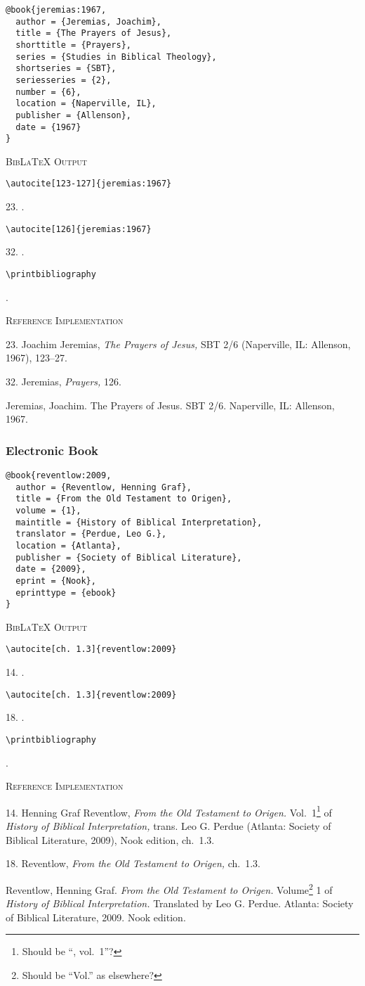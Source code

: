 \documentclass[a4paper]{article}
\newcommand\citetest[5]{%
  {\textsc{BibLaTeX Output}\par
   \nobreak
   \texttt{\textbackslash autocite[#2]\{#5\}}\par
   \color{biblatex-colour}
   #1. \cite[#2]{#5}.\par
   \color{black}
   \texttt{\textbackslash autocite[#4]\{#5\}}\par
   \color{biblatex-colour}
   #3. \cite[#4]{#5}.\par
   \color{black}
   \texttt{\textbackslash printbibliography}\par
   \color{biblatex-colour}
   \hangindent\bibindent\bibentrycite{#5}.\par}}
\newenvironment{refimp}{%
  \begin{minipage}{\linewidth}
    \setlength{\parskip}{1ex}
    \textsc{Reference Implementation}\par
    \nobreak
    \color{reference-colour}
}{\end{minipage}}
\begin{document}
\begin{lstlisting}
@book{jeremias:1967,
  author = {Jeremias, Joachim},
  title = {The Prayers of Jesus},
  shorttitle = {Prayers},
  series = {Studies in Biblical Theology},
  shortseries = {SBT},
  seriesseries = {2},
  number = {6},
  location = {Naperville, IL},
  publisher = {Allenson},
  date = {1967}
}
\end{lstlisting}

\citetest{23}{123-127}{32}{126}{jeremias:1967}

\begin{refimp}
  23. Joachim Jeremias, \emph{The Prayers of Jesus,} SBT 2/6 (Naperville, IL:
  Allenson, 1967), 123–27.

  32. Jeremias, \emph{Prayers,} 126.

  \hangindent\bibindent Jeremias, Joachim. The Prayers of Jesus. SBT 2/6.
  Naperville, IL: Allenson, 1967.
\end{refimp}

\subsubsection{Electronic Book}

\begin{lstlisting}
@book{reventlow:2009,
  author = {Reventlow, Henning Graf},
  title = {From the Old Testament to Origen},
  volume = {1},
  maintitle = {History of Biblical Interpretation},
  translator = {Perdue, Leo G.},
  location = {Atlanta},
  publisher = {Society of Biblical Literature},
  date = {2009},
  eprint = {Nook},
  eprinttype = {ebook}
}
\end{lstlisting}

\citetest{14}{ch.~1.3}{18}{ch.~1.3}{reventlow:2009}

\begin{refimp}
  14. Henning Graf Reventlow, \emph{From the Old Testament to Origen.}
  Vol.~1\footnote{Should be “, vol.~1”?} of \emph{History of Biblical
  Interpretation,} trans. Leo G. Perdue (Atlanta: Society of Biblical
  Literature, 2009), Nook edition, ch.~1.3.

  18. Reventlow, \emph{From the Old Testament to Origen,} ch.~1.3.
  
  \hangindent\bibindent Reventlow, Henning Graf. \emph{From the Old Testament
  to Origen.} Volume\footnote{Should be “Vol.” as elsewhere?} 1 of
  \emph{History of Biblical Interpretation.} Translated by Leo G. Perdue.
  Atlanta: Society of Biblical Literature, 2009. Nook edition.
\end{refimp}
\end{document}
